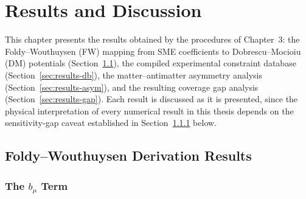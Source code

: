 \chapter{Results and Discussion}
\label{ch:results}

This chapter presents the results obtained by the procedures of Chapter~3:
the Foldy--Wouthuysen (FW) mapping from SME coefficients to
Dobrescu--Mocioiu (DM) potentials (Section~\ref{sec:results-fw}), the
compiled experimental constraint database (Section~\ref{sec:results-db}),
the matter--antimatter asymmetry analysis (Section~\ref{sec:results-asym}),
and the resulting coverage gap analysis
(Section~\ref{sec:results-gap}). Each result is discussed as it is
presented, since the physical interpretation of every numerical result in
this thesis depends on the sensitivity-gap caveat established in
Section~\ref{sec:results-fw-bmu} below.

\section{Foldy--Wouthuysen Derivation Results}
\label{sec:results-fw}

\subsection{The \texorpdfstring{$b_\mu$}{b\_mu} Term}
\label{sec:results-fw-bmu}

